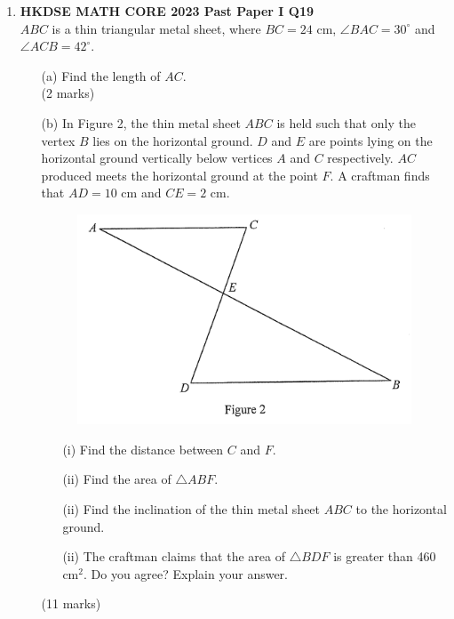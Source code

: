 \documentclass[12pt]{article}
\begin{document}
\begin{enumerate}
	\item \textbf{HKDSE MATH CORE 2023 Past Paper I Q19}\\
	$ABC$ is a thin triangular metal sheet, where $BC = 24$ cm, $\angle BAC = 30^\circ$ and $\angle ACB = 42^\circ$.	
	\begin{enumerate}
		\item[(a)] Find the length of $AC$. \\(2 marks)
		\item[(b)] In Figure 2, the thin metal sheet $ABC$ is held such that only the vertex $B$ lies on the horizontal ground. $D$ and $E$ are points lying on the horizontal ground vertically below vertices $A$ and $C$ respectively. $AC$ produced meets the horizontal ground at the point $F$. A craftman finds that $AD = 10$ cm and $CE = 2$ cm.
		\begin{figure}[H]
			\centering
			\includegraphics[width = .3\linewidth]{2023Figure1.2}
		\end{figure}
		\begin{enumerate}
			\item[(i)] Find the distance between $C$ and $F$.
			\item[(ii)] Find the area of $\triangle ABF$.
			\item[(ii)] Find the inclination of the thin metal sheet $ABC$ to the horizontal ground.
			\item[(ii)] The craftman claims that the area of $\triangle BDF$ is greater than 460 cm$^2$. Do you agree? Explain your answer.
		\end{enumerate}
		(11 marks)
	\end{enumerate}


\end{enumerate}
\end{document}
